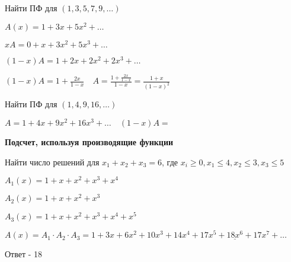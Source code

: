 \documentclass[12pt]{article}
\begin{document}
    \Ex Найти ПФ для $(1, 3, 5, 7, 9, \dots)$

    $\displaystyle A(x) = 1 + 3x + 5x^2 + \dots$

    $\displaystyle xA = 0 + x + 3x^2 + 5x^3 + \dots$

    $\displaystyle (1 - x)A = 1 + 2x + 2x^2 + 2x^3 + \dots$

    $\displaystyle (1 - x)A = 1 + \frac{2x}{1 - x} \quad A = \frac{1 + \frac{2x}{1 - x}}{1 - x} = \frac{1 + x}{(1 - x)^2}$

    \Ex Найти ПФ для $(1, 4, 9, 16, \dots)$

    $\displaystyle A = 1 + 4x + 9x^2 + 16x^3 + \dots \quad (1 - x)A = $

    \item \textbf{Подсчет, используя производящие функции}

    Найти число решений для $\displaystyle x_1 + x_2 + x_3 = 6$, где $\displaystyle x_i \geq 0, x_1 \leq 4, x_2 \leq 3, x_3 \leq 5$

    $\displaystyle A_1(x) = 1 + x + x^2 + x^3 + x^4$

    $\displaystyle A_2(x) = 1 + x + x^2 + x^3$

    $\displaystyle A_3(x) = 1 + x + x^2 + x^3 + x^4 + x^5$

    $\displaystyle A(x) = A_1 \cdot A_2 \cdot A_3 = 1 + 3x + 6x^2 + 10x^3 + 14x^4 + 17x^5 + \underline{18x^6} + 17x^7 + \dots$

    Ответ - 18
\end{document}
